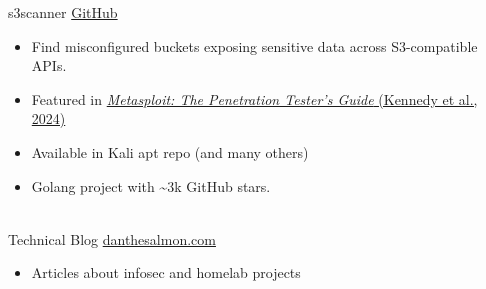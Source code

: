 \documentclass[a4paper]{twentysecondcv} %
\begin{document}
\begin{twenty}
    
    \twentyitem
    	{\hspace{10mm} \Large \faDatabase}
		{}
        {s3scanner}
        {\href{https://github.com/sa7mon/s3scanner}{GitHub}}
        {\vspace{-2mm}}
        {\begin{itemize}
            \item Find misconfigured buckets exposing sensitive data across S3-compatible APIs.
            \item Featured in \href{https://nostarch.com/metasploit-2nd-edition}{\textit{Metasploit: The Penetration Tester's Guide} (Kennedy et al., 2024)}
            \item Available in Kali apt repo (and many others)
            \item Golang project with \textasciitilde3k GitHub stars.
        \end{itemize}}
\\
    \twentyitem
    	{\hspace{10mm} \Large \faPencil}
		{}
        {Technical Blog}
        {\href{https://danthesalmon.com/posts/}{danthesalmon.com}}
        {\vspace{-2mm}}
        {\begin{itemize}
            \item Articles about infosec and homelab projects 

\end{itemize}}
\end{twenty}
\end{document}
